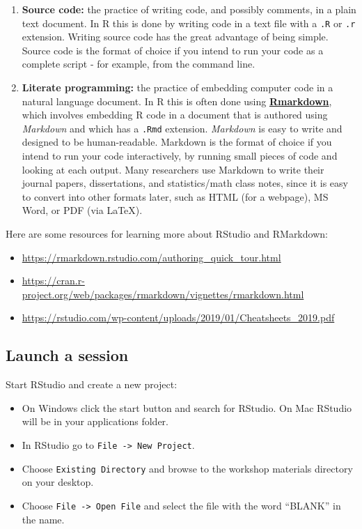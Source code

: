 \documentclass[
]{book}
\providecommand{\tightlist}{%
  \setlength{\itemsep}{0pt}\setlength{\parskip}{0pt}}
\begin{document}
\begin{enumerate}
\def\labelenumi{\arabic{enumi}.}
\item
  \textbf{Source code:} the practice of writing code, and possibly comments, in a plain text document. In R this is done by writing code in a text file with a \texttt{.R} or \texttt{.r} extension. Writing source code has the great advantage of being simple. Source code is the format of choice if you intend to run your code as a complete script - for example, from the command line.
\item
  \textbf{Literate programming:} the practice of embedding computer code in a natural language document. In R this is often done using \href{https://rmarkdown.rstudio.com/}{\textbf{Rmarkdown}}, which involves embedding R code in a document that is authored using \emph{Markdown} and which has a \texttt{.Rmd} extension. \emph{Markdown} is easy to write and designed to be human-readable. Markdown is the format of choice if you intend to run your code interactively, by running small pieces of code and looking at each output. Many researchers use Markdown to write their journal papers, dissertations, and statistics/math class notes, since it is easy to convert into other formats later, such as HTML (for a webpage), MS Word, or PDF (via LaTeX).
\end{enumerate}

Here are some resources for learning more about RStudio and RMarkdown:

\begin{itemize}
\tightlist
\item
  \url{https://rmarkdown.rstudio.com/authoring_quick_tour.html}
\item
  \url{https://cran.r-project.org/web/packages/rmarkdown/vignettes/rmarkdown.html}
\item
  \url{https://rstudio.com/wp-content/uploads/2019/01/Cheatsheets_2019.pdf}
\end{itemize}

\hypertarget{launch-a-session}{%
\subsection{Launch a session}\label{launch-a-session}}

Start RStudio and create a new project:

\begin{itemize}
\tightlist
\item
  On Windows click the start button and search for RStudio. On Mac RStudio will be in your applications folder.
\item
  In RStudio go to \texttt{File\ -\textgreater{}\ New\ Project}.
\item
  Choose \texttt{Existing\ Directory} and browse to the workshop materials directory on your desktop.
\item
  Choose \texttt{File\ -\textgreater{}\ Open\ File} and select the file with the word ``BLANK'' in the name.
\end{itemize}
\end{document}
